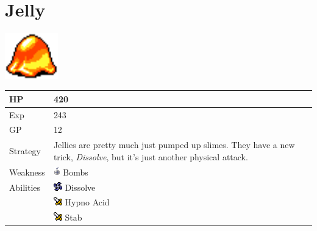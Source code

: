 \section{Jelly}
\label{monster:jelly}

\includegraphics[height=2cm,keepaspectratio]{./resources/monster/jelly}

\begin{longtable}{ l p{9cm} }
	HP
	& 420
\\ \hline
	Exp
	& 243
\\ \hline
	GP
	& 12
\\ \hline
	Strategy
	& Jellies are pretty much just pumped up slimes. They have a new trick, \textit{Dissolve}, but it's just another physical attack.
\\ \hline
	Weakness
	& \includegraphics[height=1em,keepaspectratio]{./resources/effects/bomb} Bombs
\\ \hline
	Abilities
	& \includegraphics[height=1em,keepaspectratio]{./resources/effects/drain} Dissolve \\
	& \includegraphics[height=1em,keepaspectratio]{./resources/effects/damage} Hypno Acid \\
	& \includegraphics[height=1em,keepaspectratio]{./resources/effects/damage} Stab
\end{longtable}
